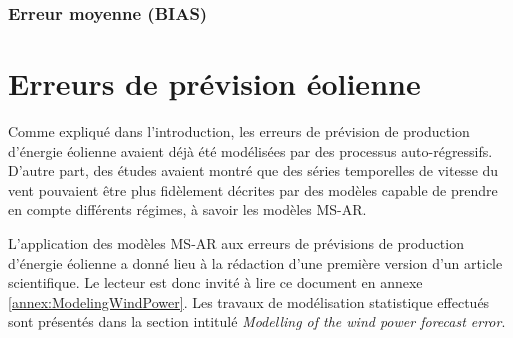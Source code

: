 \documentclass[12pt]{report}
\begin{document}
\subsection{Erreur moyenne (BIAS)}
\label{subsec:Model_Metric_BIAS}
%
%
 


\chapter{Erreurs de prévision éolienne}
\label{chap:ResultatsEolien}


Comme expliqué dans l'introduction, les erreurs de prévision de production d'énergie éolienne avaient déjà été modélisées par des processus auto-régressifs. D'autre part, des études avaient montré que des séries temporelles de vitesse du vent pouvaient être plus fidèlement décrites par des modèles capable de prendre en compte différents régimes, à savoir les modèles MS-AR.   

L'application des modèles MS-AR aux erreurs de prévisions de production d'énergie éolienne a donné lieu à la rédaction d'une première version d'un article scientifique. Le lecteur est donc invité à lire ce document en annexe \ref{annex:ModelingWindPower}. Les travaux de modélisation statistique effectués sont présentés dans la section intitulé \textit{Modelling of the wind power forecast error}.
\end{document}

